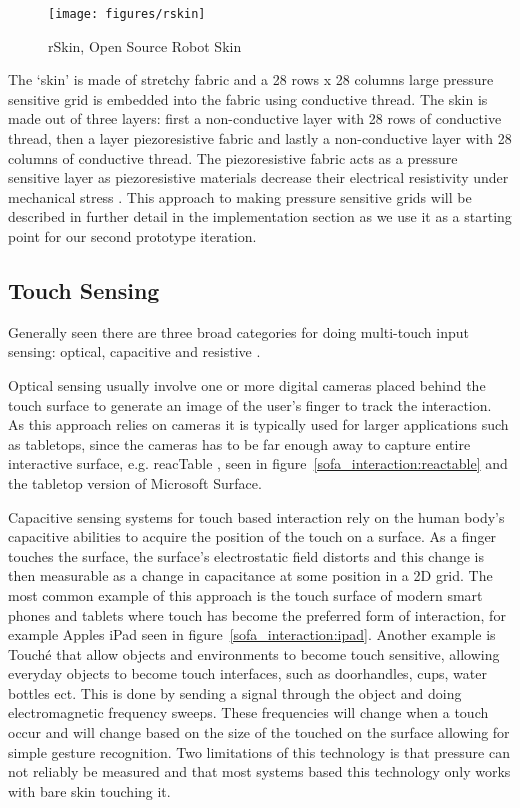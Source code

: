 \begin{figure}[hb]
	\centering
  		\texttt{[image: figures/rskin]}
	\caption[rSkin, Open Source Robot Skin]
   {rSkin, Open Source Robot Skin}
   \label{rskin}
\end{figure}
The `skin' is made of stretchy fabric and a 28 rows x 28 columns large pressure sensitive grid is embedded into the fabric using conductive thread.
The skin is made out of three layers: first a non-conductive layer with 28 rows of conductive thread, then a layer piezoresistive fabric and lastly a non-conductive layer with 28 columns of conductive thread.
The piezoresistive fabric acts as a pressure sensitive layer as piezoresistive materials decrease their electrical resistivity under mechanical stress \citep{piezoresistiveWIKIPEDIA}.
This approach to making pressure sensitive grids will be described in further detail in the implementation section as we use it as a starting point for our second prototype iteration.

\subsection{Touch Sensing}

Generally seen there are three broad categories for doing multi-touch input sensing: optical, capacitive and resistive \citep{rosenberg2009unmousepad}.

Optical sensing usually involve one or more digital cameras placed behind the touch surface to generate an image of the user's finger to track the interaction.
As this approach relies on cameras it is typically used for larger applications such as tabletops, since the cameras has to be far enough away to capture entire interactive surface, e.g. reacTable \citep{jorda2007reactable}, seen in figure~\ref{sofa_interaction:reactable} and the tabletop version of Microsoft Surface.

Capacitive sensing systems for touch based interaction rely on the human body's capacitive abilities to acquire the position of the touch on a surface. 
As a finger touches the surface, the surface's electrostatic field distorts and this change is then measurable as a change in capacitance at some position in a 2D grid.
The most common example of this approach is the touch surface of modern smart phones and tablets where touch has become the preferred form of interaction, for example Apples iPad seen in figure~\ref{sofa_interaction:ipad}.
Another example is Touch\'e \citep{sato2012touche} that allow objects and environments to become touch sensitive, allowing everyday objects to become touch interfaces, such as doorhandles, cups, water bottles ect.
This is done by sending a signal through the object and doing electromagnetic frequency sweeps. 
These frequencies will change when a touch occur and will change based on the size of the touched on the surface allowing for simple gesture recognition.
Two limitations of this technology is that pressure can not reliably be measured and that most systems based this technology only works with bare skin touching it.    

